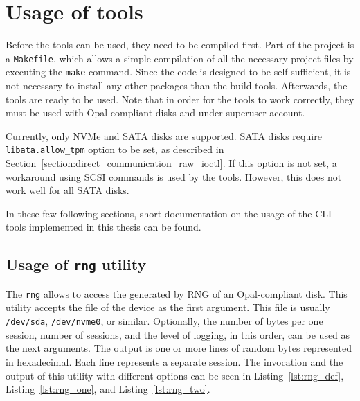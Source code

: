 \appendix


\chapter{Usage of tools}
\label{appendix:usage}

Before the tools can be used, they need to be compiled first. Part of the project is a \verb|Makefile|, which allows a simple compilation of all the necessary project files by executing the \verb|make| command. Since the code is designed to be self-sufficient, it is not necessary to install any other packages than the build tools. Afterwards, the tools are ready to be used.
Note that in order for the tools to work correctly, they must be used with Opal-compliant disks and under superuser account.

Currently, only NVMe and SATA disks are supported. SATA disks require \verb|libata.allow_tpm| option to be set, as described in Section~\ref{section:direct_communication_raw_ioctl}. If this option is not set, a workaround using SCSI commands is used by the tools. However, this does not work well for all SATA disks.

In these few following sections, short documentation on the usage of the CLI tools implemented in this thesis can be found.

\section{Usage of \texttt{rng} utility}

The \verb|rng| allows to access the generated by RNG of an Opal-compliant disk.
This utility accepts the file of the device as the first argument. This file is usually \verb|/dev/sda|, \verb|/dev/nvme0|, or similar.
Optionally, the number of bytes per one session, number of sessions, and the level of logging, in this order, can be used as the next arguments.
The output is one or more lines of random bytes represented in hexadecimal. Each line represents a separate session. The invocation and the output of this utility with different options can be seen in Listing~\ref{lst:rng_def}, Listing~\ref{lst:rng_one}, and Listing~\ref{lst:rng_two}.



